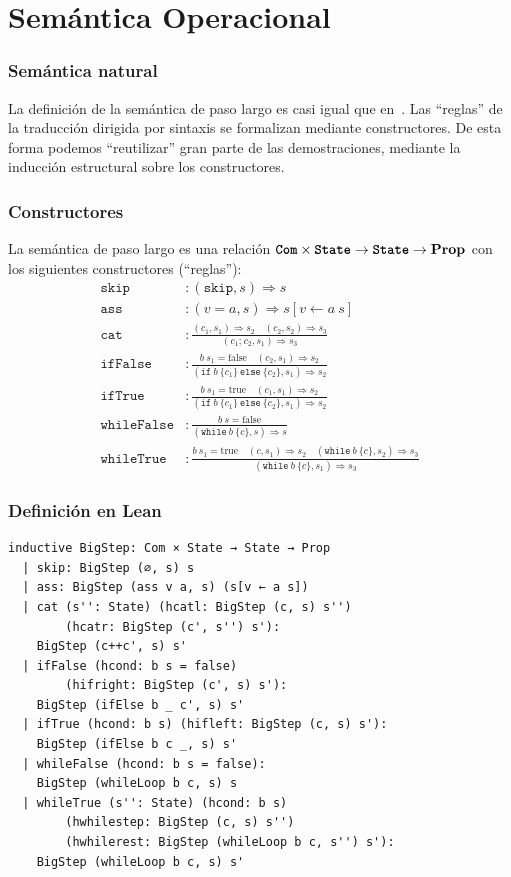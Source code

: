 \documentclass[9pt]{beamer}
\newcommand{\funfont}[1]{\texttt{#1}}
\newcommand{\tyfont}[1]{\texttt{\textbf{#1}}}
\renewcommand{\implies}{\rightarrow}
\newcommand{\Prop}{\mathbf{Prop}}
\newcommand{\ImpIfElse}[3]{\texttt{if} \ {#1} \ \{{#2}\} \ \texttt{else} \ \{{#3}\}}
\newcommand{\ImpWhile}[2]{\texttt{while} \ {#1} \ \{{#2}\}}
\newcommand{\ImpConcat}[2]{{#1} \texttt{;} \ {#2}}
\newcommand{\ImpSkip}{\texttt{skip}}
\newcommand{\LeanTrue}{\text{true}}
\newcommand{\LeanFalse}{\text{false}}
\newcommand{\bigstep}{\Longrightarrow}
\begin{document}
\section{Semántica Operacional}
\begin{frame}
\frametitle{Semántica natural}

La definición de la semántica de paso largo es casi igual que en~\cite{winskel_formal_semantics}.
Las \enquote{reglas} de la traducción dirigida por sintaxis se formalizan mediante constructores.
De esta forma podemos \enquote{reutilizar} gran parte de las demostraciones, mediante
la inducción estructural sobre los constructores.

\end{frame}

\begin{frame}
\frametitle{Constructores}
La semántica de paso largo es una relación \(\tyfont{Com} \times \tyfont{State} \implies \tyfont{State} \implies \Prop\)
con los siguientes constructores (\enquote{reglas}):
\begin{align*}
  \ImpSkip &: (\ImpSkip, s) \bigstep s \\
  \funfont{ass} &: (v = a, s) \bigstep s[v \leftarrow a \ s] \\
  \funfont{cat} &: \frac{
    (c_1, s_1) \bigstep s_2 \quad (c_2, s_2) \bigstep s_3
  }{
    (\ImpConcat{c_1}{c_2}, s_1) \bigstep s_3
  } \\
  \funfont{ifFalse} &: \frac{b \ s_1 = \LeanFalse \quad (c_2, s_1) \bigstep s_2}
    {(\ImpIfElse{b}{c_1}{c_2}, s_1) \bigstep s_2} \\
  \funfont{ifTrue} &: \frac{b \ s_1 = \LeanTrue \quad (c_1, s_1) \bigstep s_2}
{(\ImpIfElse{b}{c_1}{c_2}, s_1) \bigstep s_2} \\
\funfont{whileFalse} &: \frac{b \ s = \LeanFalse}
  {(\ImpWhile{b}{c}, s) \bigstep s} \\
  \funfont{whileTrue} &: \frac{b \ s_1 = \LeanTrue \quad (c, s_1) \bigstep s_2 \quad
  (\ImpWhile{b}{c}, s_2) \bigstep s_3}
{(\ImpWhile{b}{c}, s_1) \bigstep s_3}
\end{align*}
\end{frame}

\begin{frame}[fragile]
\frametitle{Definición en Lean}
\begin{verbatim}
inductive BigStep: Com × State → State → Prop
  | skip: BigStep (∅, s) s
  | ass: BigStep (ass v a, s) (s[v ← a s])
  | cat (s'': State) (hcatl: BigStep (c, s) s'') 
        (hcatr: BigStep (c', s'') s'):
    BigStep (c++c', s) s'
  | ifFalse (hcond: b s = false) 
        (hifright: BigStep (c', s) s'):
    BigStep (ifElse b _ c', s) s'
  | ifTrue (hcond: b s) (hifleft: BigStep (c, s) s'):
    BigStep (ifElse b c _, s) s'
  | whileFalse (hcond: b s = false):
    BigStep (whileLoop b c, s) s
  | whileTrue (s'': State) (hcond: b s) 
        (hwhilestep: BigStep (c, s) s'')
        (hwhilerest: BigStep (whileLoop b c, s'') s'):
    BigStep (whileLoop b c, s) s'
\end{verbatim}
\end{frame}
\end{document}

